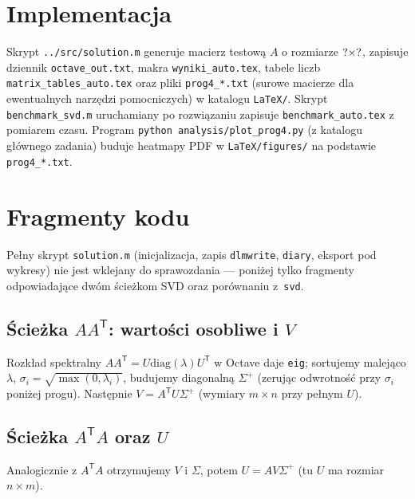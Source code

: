 \documentclass[polish]{template/projectreport}
\begin{document}
\section{Implementacja}
\begin{sloppypar}
Skrypt \texttt{../src/solution.m} generuje macierz testową $A$ o rozmiarze $?\times?$, zapisuje dziennik
\texttt{octave\_out.txt}, makra \texttt{wyniki\_auto.tex}, tabele liczb \texttt{matrix\_tables\_auto.tex}
oraz pliki \texttt{prog4\_*.txt} (surowe macierze dla ewentualnych narzędzi pomocniczych) w katalogu \texttt{LaTeX/}.
Skrypt \texttt{benchmark\_svd.m} uruchamiany po rozwiązaniu zapisuje \texttt{benchmark\_auto.tex} z pomiarem czasu.
Program \texttt{python analysis/plot\_prog4.py} (z katalogu głównego zadania) buduje heatmapy PDF w \texttt{LaTeX/figures/}
na podstawie \texttt{prog4\_*.txt}.
\end{sloppypar}

\section{Fragmenty kodu}
Pełny skrypt \texttt{solution.m} (inicjalizacja, zapis \texttt{dlmwrite}, \texttt{diary}, eksport pod wykresy)
nie jest wklejany do sprawozdania --- poniżej tylko fragmenty odpowiadające dwóm ścieżkom SVD oraz porównaniu z~\texttt{svd}.

\subsection{Ścieżka $AA^{\mathsf{T}}$: wartości osobliwe i $V$}
Rozkład spektralny $AA^{\mathsf{T}}=U\mathrm{diag}(\lambda)U^{\mathsf{T}}$ w Octave daje \texttt{eig}; sortujemy malejąco $\lambda$,
$\sigma_i=\sqrt{\max(0,\lambda_i)}$, budujemy diagonalną $\Sigma^{+}$ (zerując odwrotność przy $\sigma_i$ poniżej progu).
Następnie $V=A^{\mathsf{T}}U\Sigma^{+}$ (wymiary $m\times n$ przy pełnym $U$).



\subsection{Ścieżka $A^{\mathsf{T}}A$ oraz $U$}
Analogicznie z $A^{\mathsf{T}}A$ otrzymujemy $V$ i $\Sigma$, potem $U=AV\Sigma^{+}$ (tu $U$ ma rozmiar $n\times m$).


\end{document}
